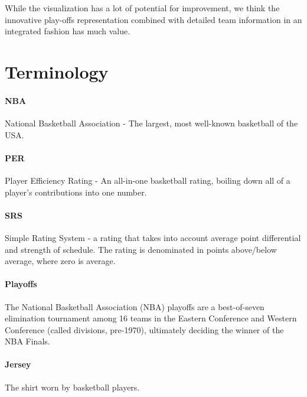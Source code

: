 \documentclass[chi_draft]{sigchi}
\begin{document}
While the visualization has a lot of potential for improvement, we think the
innovative play-offs representation combined with detailed team information in
an integrated fashion has much value.

%
%
%
%
%
\balance{}

%
\printbibliography

\appendix
\section{Terminology}\label{sec:terminology}

\paragraph{NBA} National Basketball Association - The largest, most well-known
basketball of the USA.

\paragraph{PER} Player Efficiency Rating - An all-in-one basketball rating,
boiling down all of a player's contributions into one number\cite{per}.

\paragraph{SRS} Simple Rating System - a rating that takes into account average
point differential and strength of schedule. The rating is denominated in points
above/below average, where zero is average\cite{srs}. 

\paragraph{Playoffs} The National Basketball Association (NBA) playoffs are a
best-of-seven elimination tournament among 16 teams in the Eastern Conference
and Western Conference (called divisions, pre-1970), ultimately deciding the
winner of the NBA Finals\cite{playoffs}.

\paragraph{Jersey} The shirt worn by basketball players.
\end{document}
